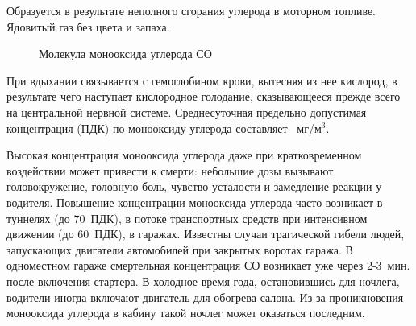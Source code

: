 Образуется в результате неполного сгорания углерода в моторном топливе. Ядовитый газ без цвета и запаха. 

\begin{figure}[H]%
  \centering
  \begin{minipage}[h]{0.4\linewidth}
  \end{minipage}
  \hfill
  \begin{minipage}[h]{0.4\linewidth}
  \end{minipage}
  \caption{Молекула монооксида углерода СО} \label{p:Carbon_monoxide}
\end{figure}%

При вдыхании связывается с гемоглобином крови, вытесняя из нее кислород, в результате чего наступает кислородное голодание, сказывающееся прежде всего на центральной нервной системе. Среднесуточная предельно допустимая концентрация (ПДК) по монооксиду углерода составляет ~мг/м$^3$.

Высокая концентрация монооксида углерода даже при кратковременном воздействии может привести к смерти: небольшие дозы вызывают головокружение, головную боль, чувство усталости и замедление реакции у водителя. Повышение концентрации монооксида углерода часто возникает в туннелях (до 70~ПДК), в потоке транспортных средств при интенсивном движении (до 60~ПДК), в гаражах. Известны случаи трагической гибели людей, запускающих двигатели автомобилей при закрытых воротах гаража. В одноместном гараже смертельная концентрация СО возникает уже через 2-3~мин. после включения стартера. В холодное время года, остановившись для ночлега, водители иногда включают двигатель для обогрева салона. Из-за проникновения монооксида углерода в кабину такой ночлег может оказаться последним.

